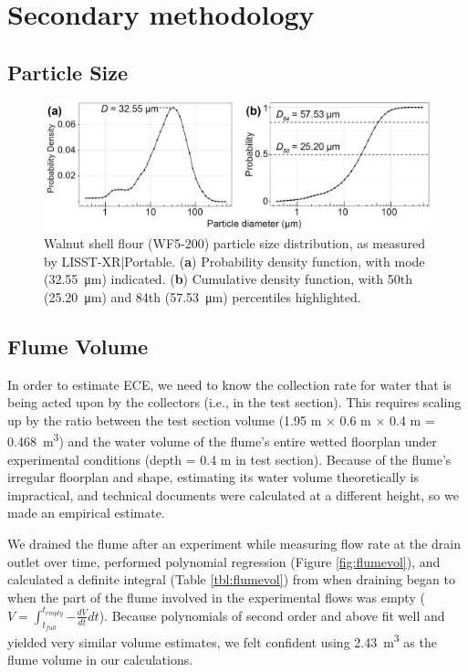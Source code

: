 \documentclass[geosciences,article,submit,moreauthors,pdftex]{Definitions/mdpi}
\begin{document}
\appendix
\section{Secondary methodology}
\unskip
\subsection{Particle Size}
\begin{figure}[H]
\centering
\includegraphics[width=5in]{../pics/wf5-200sizedist.png}
\caption{Walnut shell flour (WF5-200) particle size distribution, as measured by LISST-XR|Portable. (\textbf{a}) Probability density function, with mode (\SI{32.55}{\micro\metre}) indicated. (\textbf{b}) Cumulative density function, with 50th (\SI{25.20}{\micro\metre}) and 84th (\SI{57.53}{\micro\metre}) percentiles highlighted.}
\end{figure}

\subsection{Flume Volume}

In order to estimate ECE, we need to know the collection rate for water that is being acted upon by the collectors (i.e., in the test section). This requires scaling up by the ratio between the test section volume (1.95 m $\times$ 0.6 m $\times$ 0.4 m = \SI{0.468}{m^3}) and the water volume of the flume's entire wetted floorplan under experimental conditions (depth = 0.4 m in test section). Because of the flume's irregular floorplan and shape, estimating its water volume theoretically is impractical, and technical documents were calculated at a different height, so we made an empirical estimate. 

We drained the flume after an experiment while measuring flow rate at the drain outlet over time, performed polynomial regression (Figure \ref{fig:flumevol}), and calculated a definite integral (Table \ref{tbl:flumevol}) from when draining began to when the part of the flume involved in the experimental flows was empty ($V = \int_{t_{full}}^{t_{empty}}{-\frac{dV}{dt}dt}$). Because polynomials of second order and above fit well and yielded very similar volume estimates, we felt confident using \SI{2.43}{\metre\cubed} as the flume volume in our calculations.
\end{document}
